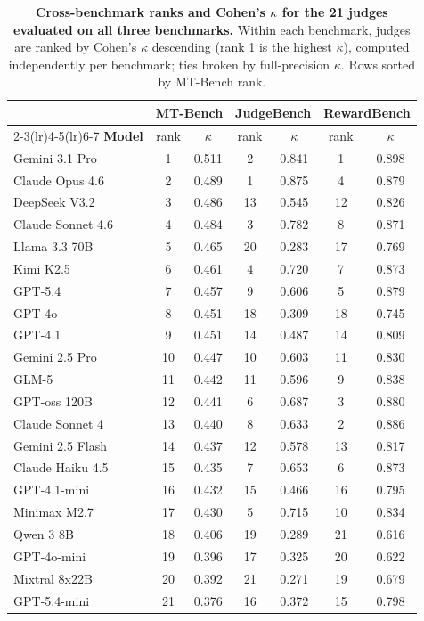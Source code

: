 \begin{table}[!t]
\centering
\small
\begin{tabular}{lcccccc}
\toprule
& \multicolumn{2}{c}{\textbf{MT-Bench}} & \multicolumn{2}{c}{\textbf{JudgeBench}} & \multicolumn{2}{c}{\textbf{RewardBench}} \\
\cmidrule(lr){2-3}\cmidrule(lr){4-5}\cmidrule(lr){6-7}
\textbf{Model} & rank & $\kappa$ & rank & $\kappa$ & rank & $\kappa$ \\
\midrule
Gemini 3.1 Pro    &  1 & 0.511 &  2 & 0.841 &  1 & 0.898 \\
Claude Opus 4.6   &  2 & 0.489 &  1 & 0.875 &  4 & 0.879 \\
DeepSeek V3.2     &  3 & 0.486 & 13 & 0.545 & 12 & 0.826 \\
Claude Sonnet 4.6 &  4 & 0.484 &  3 & 0.782 &  8 & 0.871 \\
Llama 3.3 70B     &  5 & 0.465 & 20 & 0.283 & 17 & 0.769 \\
Kimi K2.5         &  6 & 0.461 &  4 & 0.720 &  7 & 0.873 \\
GPT-5.4           &  7 & 0.457 &  9 & 0.606 &  5 & 0.879 \\
GPT-4o            &  8 & 0.451 & 18 & 0.309 & 18 & 0.745 \\
GPT-4.1           &  9 & 0.451 & 14 & 0.487 & 14 & 0.809 \\
Gemini 2.5 Pro    & 10 & 0.447 & 10 & 0.603 & 11 & 0.830 \\
GLM-5             & 11 & 0.442 & 11 & 0.596 &  9 & 0.838 \\
GPT-oss 120B      & 12 & 0.441 &  6 & 0.687 &  3 & 0.880 \\
Claude Sonnet 4   & 13 & 0.440 &  8 & 0.633 &  2 & 0.886 \\
Gemini 2.5 Flash  & 14 & 0.437 & 12 & 0.578 & 13 & 0.817 \\
Claude Haiku 4.5  & 15 & 0.435 &  7 & 0.653 &  6 & 0.873 \\
GPT-4.1-mini      & 16 & 0.432 & 15 & 0.466 & 16 & 0.795 \\
Minimax M2.7      & 17 & 0.430 &  5 & 0.715 & 10 & 0.834 \\
Qwen 3 8B         & 18 & 0.406 & 19 & 0.289 & 21 & 0.616 \\
GPT-4o-mini       & 19 & 0.396 & 17 & 0.325 & 20 & 0.622 \\
Mixtral 8x22B     & 20 & 0.392 & 21 & 0.271 & 19 & 0.679 \\
GPT-5.4-mini      & 21 & 0.376 & 16 & 0.372 & 15 & 0.798 \\
\bottomrule
\end{tabular}
\caption{\textbf{Cross-benchmark ranks and Cohen's $\kappa$ for the 21
judges evaluated on all three benchmarks.} Within each benchmark,
judges are ranked by Cohen's $\kappa$ descending (rank 1 is the highest
$\kappa$), computed independently per benchmark; ties broken by
full-precision $\kappa$. Rows sorted by MT-Bench rank.}
\label{app:cross-bench-ranks}
\end{table}


